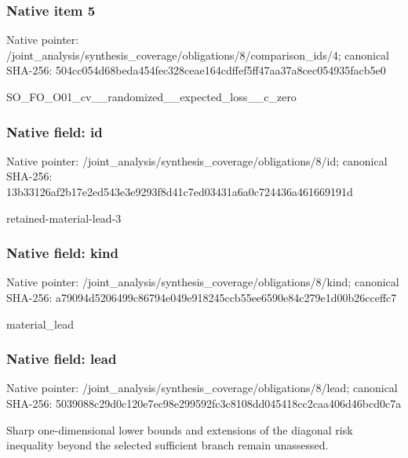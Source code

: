 \documentclass[10pt,a4paper]{article}
\begin{document}
\subsubsection{Native item 5}
Native pointer: /joint\_\allowbreak{}analysis/synthesis\_\allowbreak{}coverage/obligations/8/comparison\_\allowbreak{}ids/4; canonical SHA-256: 504cc054d68beda454fec328ceae164cdffef5ff47aa37a8cec054935facb5e0

\begingroup\raggedright\sloppy SO\_\allowbreak{}FO\_\allowbreak{}O01\_\allowbreak{}cv\_\allowbreak{}\_\allowbreak{}randomized\_\allowbreak{}\_\allowbreak{}expected\_\allowbreak{}loss\_\allowbreak{}\_\allowbreak{}c\_\allowbreak{}zero\par\endgroup

\subsubsection{Native field: id}
Native pointer: /joint\_\allowbreak{}analysis/synthesis\_\allowbreak{}coverage/obligations/8/id; canonical SHA-256: 13b33126af2b17e2ed543e3e9293f8d41c7ed03431a6a0c724436a461669191d

\begingroup\raggedright\sloppy retained-material-lead-3\par\endgroup

\subsubsection{Native field: kind}
Native pointer: /joint\_\allowbreak{}analysis/synthesis\_\allowbreak{}coverage/obligations/8/kind; canonical SHA-256: a79094d5206499c86794e049e918245ccb55ee6590e84c279e1d00b26cceffc7

\begingroup\raggedright\sloppy material\_\allowbreak{}lead\par\endgroup

\subsubsection{Native field: lead}
Native pointer: /joint\_\allowbreak{}analysis/synthesis\_\allowbreak{}coverage/obligations/8/lead; canonical SHA-256: 5039088c29d0c120e7ec98e299592fc3c8108dd045418cc2caa406d46bcd0c7a

\begingroup\raggedright\sloppy Sharp one-dimensional lower bounds and extensions of the diagonal risk inequality beyond the selected sufficient branch remain unassessed.\par\endgroup
\end{document}

